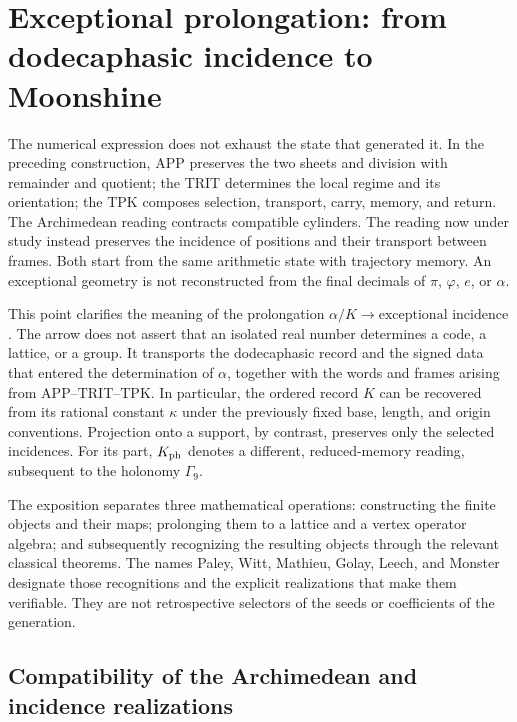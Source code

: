 \section{Exceptional prolongation: from dodecaphasic incidence to Moonshine}
\label{exc:seccion}

The numerical expression does not exhaust the state that generated it. In the
preceding construction, APP preserves the two sheets and division with
remainder and quotient; the TRIT determines the local regime and its orientation;
the TPK composes selection, transport, carry, memory, and return. The
Archimedean reading contracts compatible cylinders. The reading now
under study instead preserves the incidence of positions and their
transport between frames. Both start from the same arithmetic state with
trajectory memory. An exceptional geometry is not
reconstructed from the final decimals
of $\pi$, $\varphi$, $e$, or $\alpha$.

This point clarifies the meaning of the prolongation
$\alpha/K\longrightarrow\text{exceptional incidence}$. The arrow does not
assert that an isolated real number determines a code, a lattice, or a
group. It transports the dodecaphasic record and the signed data that
entered the determination of $\alpha$, together with the words and
frames arising from APP--TRIT--TPK. In particular, the ordered record
$K$ can be recovered from its rational constant $\kappa$ under the
previously fixed base, length, and origin conventions. Projection onto a
support, by contrast, preserves only the selected incidences.
For its part, $K_{\rm ph}$
denotes a different, reduced-memory reading, subsequent to the holonomy
$\Gamma_9$.

The exposition separates three mathematical operations: constructing the
finite objects and their maps; prolonging them to a lattice and a vertex
operator algebra; and subsequently recognizing the resulting objects through
the relevant classical theorems. The names Paley, Witt, Mathieu, Golay, Leech, and
Monster designate those recognitions and the explicit realizations
that make them verifiable. They are not retrospective selectors of the
seeds or coefficients of the generation.





\subsection{Compatibility of the Archimedean and incidence realizations}
\label{exc:doble-lectura}

